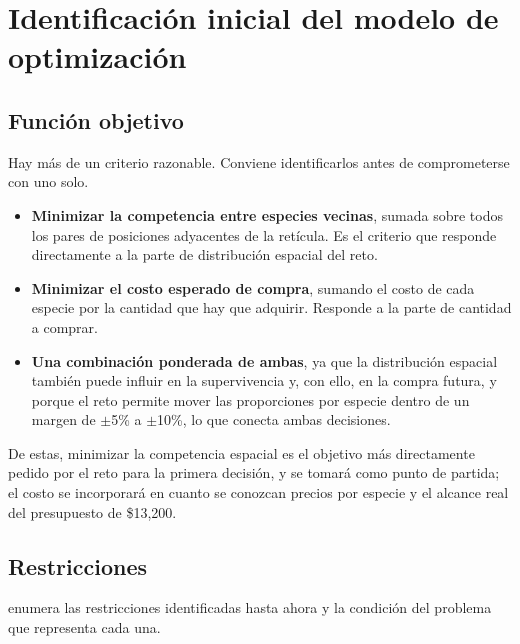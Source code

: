 \section{Identificación inicial del modelo de optimización}
\label{sec:modelo-optimizacion}

\subsection{Función objetivo}
\label{subsec:funcion-objetivo}

Hay más de un criterio razonable. Conviene identificarlos antes de comprometerse con uno solo.

\begin{itemize}
\item \textbf{Minimizar la competencia entre especies vecinas}, sumada sobre todos los pares de posiciones adyacentes de la retícula. Es el criterio que responde directamente a la parte de distribución espacial del reto.
\item \textbf{Minimizar el costo esperado de compra}, sumando el costo de cada especie por la cantidad que hay que adquirir. Responde a la parte de cantidad a comprar.
\item \textbf{Una combinación ponderada de ambas}, ya que la distribución espacial también puede influir en la supervivencia y, con ello, en la compra futura, y porque el reto permite mover las proporciones por especie dentro de un margen de $\pm$5\% a $\pm$10\%, lo que conecta ambas decisiones.
\end{itemize}

De estas, minimizar la competencia espacial es el objetivo más directamente pedido por el reto para la primera decisión, y se tomará como punto de partida; el costo se incorporará en cuanto se conozcan precios por especie y el alcance real del presupuesto de \$13{,}200.

\subsection{Restricciones}
\label{subsec:restricciones}

 enumera las restricciones identificadas hasta ahora y la condición del problema que representa cada una.

